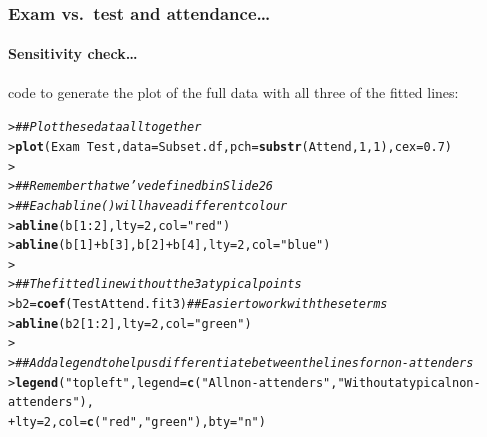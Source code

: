 \documentclass{beamer}\usepackage[]{graphicx}\usepackage[]{xcolor}
\makeatletter
\newcommand{\hlnum}[1]{\textcolor[rgb]{0.686,0.059,0.569}{#1}}%
\newcommand{\hlstr}[1]{\textcolor[rgb]{0.192,0.494,0.8}{#1}}%
\newcommand{\hlcom}[1]{\textcolor[rgb]{0.678,0.584,0.686}{\textit{#1}}}%
\newcommand{\hlopt}[1]{\textcolor[rgb]{0,0,0}{#1}}%
\newcommand{\hlstd}[1]{\textcolor[rgb]{0.345,0.345,0.345}{#1}}%
\newcommand{\hlkwb}[1]{\textcolor[rgb]{0.69,0.353,0.396}{#1}}%
\newcommand{\hlkwc}[1]{\textcolor[rgb]{0.333,0.667,0.333}{#1}}%
\newcommand{\hlkwd}[1]{\textcolor[rgb]{0.737,0.353,0.396}{\textbf{#1}}}%
\newenvironment{kframe}{%
 \def\at@end@of@kframe{}%
 \ifinner\ifhmode%
  \def\at@end@of@kframe{\end{minipage}}%
  \begin{minipage}{\columnwidth}%
 \fi\fi%
 \def\FrameCommand##1{\hskip\@totalleftmargin \hskip-\fboxsep
 \colorbox{shadecolor}{##1}\hskip-\fboxsep
     \hskip-\linewidth \hskip-\@totalleftmargin \hskip\columnwidth}%
 \MakeFramed {\advance\hsize-\width
   \@totalleftmargin\z@ \linewidth\hsize
   \@setminipage}}%
 {\par\unskip\endMakeFramed%
 \at@end@of@kframe}
\newenvironment{knitrout}{}{} %
\makeatother
\begin{document}
\begin{frame}[fragile]
\frametitle{Exam vs.\ test \textbf{and} attendance\ldots}
\framesubtitle{Sensitivity check\ldots}

 code to generate the plot of the full data with all three of the fitted lines:
\begin{knitrout}\scriptsize
{}\color{fgcolor}\begin{kframe}
\begin{alltt}
\hlstd{> }\hlcom{## Plot these data all together}
\hlstd{> }\hlkwd{plot}\hlstd{(Exam} \hlopt{~} \hlstd{Test,} \hlkwc{data} \hlstd{= Subset.df,}\hlkwc{pch} \hlstd{=} \hlkwd{substr}\hlstd{(Attend,} \hlnum{1}\hlstd{,} \hlnum{1}\hlstd{),}\hlkwc{cex} \hlstd{=} \hlnum{0.7}\hlstd{)}
\hlstd{> }
\hlstd{> }\hlcom{## Remember that we've defined b in Slide 26}
\hlstd{> }\hlcom{## Each abline() will have a different colour}
\hlstd{> }\hlkwd{abline}\hlstd{(b[}\hlnum{1}\hlopt{:}\hlnum{2}\hlstd{],} \hlkwc{lty} \hlstd{=} \hlnum{2}\hlstd{,} \hlkwc{col} \hlstd{=} \hlstr{"red"}\hlstd{)}
\hlstd{> }\hlkwd{abline}\hlstd{(b[}\hlnum{1}\hlstd{]} \hlopt{+} \hlstd{b[}\hlnum{3}\hlstd{], b[}\hlnum{2}\hlstd{]} \hlopt{+} \hlstd{b[}\hlnum{4}\hlstd{],} \hlkwc{lty} \hlstd{=} \hlnum{2}\hlstd{,} \hlkwc{col} \hlstd{=} \hlstr{"blue"}\hlstd{)}
\hlstd{> }
\hlstd{> }\hlcom{## The fitted line without the 3 atypical points}
\hlstd{> }\hlstd{b2} \hlkwb{=} \hlkwd{coef}\hlstd{(TestAttend.fit3)} \hlcom{## Easier to work with these terms}
\hlstd{> }\hlkwd{abline}\hlstd{(b2[}\hlnum{1}\hlopt{:}\hlnum{2}\hlstd{],} \hlkwc{lty} \hlstd{=} \hlnum{2}\hlstd{,} \hlkwc{col} \hlstd{=} \hlstr{"green"}\hlstd{)}
\hlstd{> }
\hlstd{> }\hlcom{## Add a legend to help us differentiate between the lines for non-attenders}
\hlstd{> }\hlkwd{legend}\hlstd{(}\hlstr{"topleft"}\hlstd{,} \hlkwc{legend} \hlstd{=} \hlkwd{c}\hlstd{(}\hlstr{"All non-attenders"}\hlstd{,} \hlstr{"Without atypical non-attenders"}\hlstd{),}
\hlstd{+ }       \hlkwc{lty} \hlstd{=} \hlnum{2}\hlstd{,} \hlkwc{col} \hlstd{=} \hlkwd{c}\hlstd{(}\hlstr{"red"}\hlstd{,} \hlstr{"green"}\hlstd{),} \hlkwc{bty} \hlstd{=} \hlstr{"n"}\hlstd{)}
\end{alltt}
\end{kframe}
\end{knitrout}

\end{frame}
\end{document}
